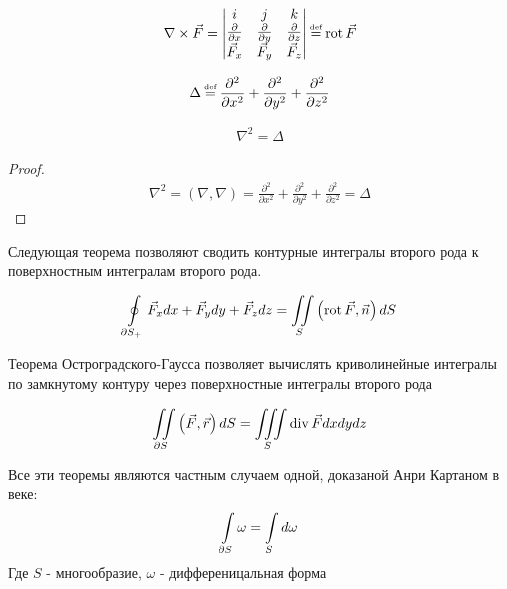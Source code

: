 \begin{definition}
	\begin{gather*}
		\nabla \times \vec{F} = 
		\begin{vmatrix}
			i & j & k \\
			\pdiff{}{x} & \pdiff{}{y} & \pdiff{}{z} \\
			\vec{F}_x & \vec{F}_y & \vec{F}_z \notag
		\end{vmatrix}
		\defeq \rot \vec{F}
	\end{gather*}
\end{definition}

\begin{definition}
	\begin{gather*}
	\Delta \defeq 
		 \frac{\partial^2}{\partial x^2} +
		 \frac{\partial^2}{\partial y^2} + 
		 \frac{\partial^2}{\partial z^2}
	\end{gather*}
\end{definition}

\begin{theorem}[О треугольниках]
	\begin{gather*}
		\nabla^2 = \Delta
	\end{gather*}
\end{theorem}

\begin{proof}
	\begin{gather*}
		\nabla^2 = \left( \nabla , \nabla \right) = 
		\frac{\partial^2}{\partial x^2} +
		\frac{\partial^2}{\partial y^2} + 
		\frac{\partial^2}{\partial z^2}
		= \Delta
	\end{gather*}
\end{proof}

Следующая теорема позволяют сводить контурные интегралы второго рода к 
поверхностным интегралам второго рода.

\begin{theorem}
	\begin{gather*}
		\oint\limits_{\partial S_{+}} \vec{F}_x dx + \vec{F}_y dy + \vec{F}_z dz =
		\iint\limits_{S} \left( \operatorname{rot} \vec{F}, \vec{n}\right)dS
	\end{gather*}
\end{theorem}
Теорема Остроградского-Гаусса позволяет вычислять криволинейные интегралы 
по замкнутому контуру через поверхностные интегралы второго рода
\begin{theorem}
	\begin{gather*}
		\iint\limits_{\partial S} \left( \vec{F}, \vec{r}\right)dS =
		\iiint\limits_{S} \operatorname{div} \vec{F} dxdydz
	\end{gather*}
\end{theorem}

\begin{nb}
	Все эти теоремы являются частным случаем одной, доказаной Анри Картаном в 
	 веке:
	\begin{gather*}
		\int\limits_{\partial S} \omega = \int\limits_{S} d\omega
	\end{gather*}
	Где $S$ - многообразие, $\omega$ - дифференицальная форма
\end{nb}
